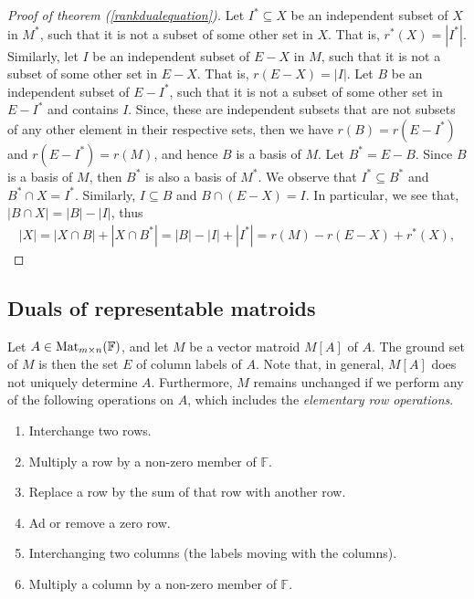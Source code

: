 \begin{proof}[Proof of theorem (\ref{rankdualequation})]
    Let $I^* \subseteq X$ be an independent subset of $X$ in $M^*$, such that it is not a subset of some other set in $X$. That is, $r^*(X)=|I^*|$. Similarly, let $I$ be an independent subset of $E-X$ in $M$, such that it is not a subset of some other set in $E-X$. That is, $r(E-X)=|I|$. Let $B$ be an independent subset of $E-I^*$, such that it is not a subset of some other set in $E-I^*$ and contains $I$. Since, these are independent subsets that are not subsets of any other element in their respective sets, then we have $r(B)=r(E-I^*)$ and $r(E-I^*)=r(M)$, and hence $B$ is a basis of $M$.
    Let $B^*=E-B$. Since $B$ is a basis of $M$, then $B ^* $ is also a basis of $M^*$. We observe that $I^*\subseteq B^*$ and  $B^*\cap X=I^*$. Similarly, $I\subseteq B$ and  $B\cap (E-X)=I$. In particular, we see that, $|B\cap X|=|B|-|I|$, thus
    \begin{align*}
    |X|=|X\cap B|+|X\cap B^*|=|B|-|I|+|I^*|=r(M)-r(E-X)+r^*(X),
    \end{align*}
    \qedhere

\end{proof}

\newpage
\subsection{Duals of representable matroids}

Let $A\in \operatorname{Mat}_{m\times n}(\mathbb{F})$, and let $M$ be a vector matroid $M[A]$ of $A$. The ground set of $M$ is then the set $E$ of column labels of $A$. Note that, in general, $M[A]$ does not uniquely determine $A$. Furthermore, $M$ remains unchanged if we perform any of the following operations on $A$, which includes the \textit{elementary row operations}.
\begin{enumerate}
    \item Interchange two rows.
    \item Multiply a row by a non-zero member of $\mathbb{F}$.
    \item Replace a row by the sum of that row with another row.
    \item Ad or remove a zero row.
    \item Interchanging two columns (the labels moving with the columns).
    \item Multiply a column by a non-zero member of $\mathbb{F}$.
\end{enumerate}

